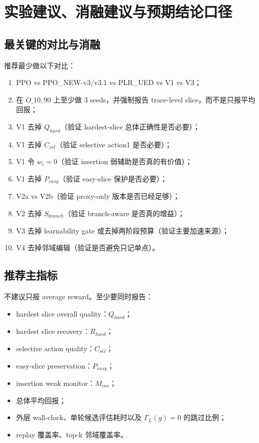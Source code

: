 \documentclass[11pt,a4paper]{ctexart}
\begin{document}
\section{实验建议、消融建议与预期结论口径}

\subsection{最关键的对比与消融}
推荐最少做以下对比：
\begin{enumerate}[leftmargin=2.2em,itemsep=0.25em]
    \item PPO vs PPO\_NEW-v3/v3.1 vs PLR\_UED vs V1 vs V3；
    \item 在 \(O\_{10,90}\) 上至少做 3 seeds，并强制报告 trace-level slice，而不是只报平均回报；
    \item V1 去掉 \(Q_{hard}\)（验证 hardest-slice 总体正确性是否必要）；
    \item V1 去掉 \(C_{sel}\)（验证 selective action1 是否必要）；
    \item V1 令 \(w_i=0\)（验证 insertion 弱辅助是否真的有价值）；
    \item V1 去掉 \(P_{easy}\)（验证 easy-slice 保护是否必要）；
    \item V2a vs V2b（验证 proxy-only 版本是否已经足够）；
    \item V2 去掉 \(S_{branch}\)（验证 branch-aware 是否真的增益）；
    \item V3 去掉 learnability gate 或去掉两阶段预算（验证主要加速来源）；
    \item V4 去掉邻域编辑（验证是否避免只记单点）。
\end{enumerate}

\subsection{推荐主指标}
不建议只报 average reward。至少要同时报告：
\begin{itemize}[leftmargin=2.2em,itemsep=0.2em]
    \item hardest slice overall quality：\(Q_{hard}\)；
    \item hardest slice recovery：\(R_{hard}\)；
    \item selective action quality：\(C_{sel}\)；
    \item easy-slice preservation：\(P_{easy}\)；
    \item insertion weak monitor：\(M_{ins}\)；
    \item 总体平均回报；
    \item 外层 wall-clock、单轮候选评估耗时以及 \(\Gamma_L(g)=0\) 的跳过比例；
    \item replay 覆盖率、top-k 邻域覆盖率。
\end{itemize}
\end{document}
